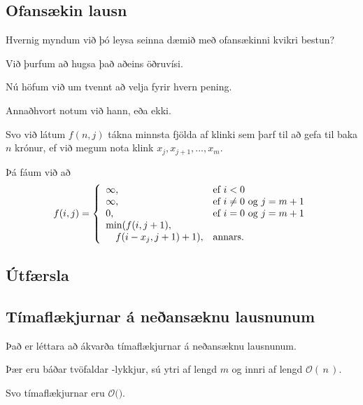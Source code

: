 \subsection{Ofansækin lausn}
{
    {
        \item<1-> Hvernig myndum við þó leysa seinna dæmið með ofansækinni kvikri bestun?
        \item<2-> Við þurfum að hugsa það aðeins öðruvísi.
        \item<3-> Nú höfum við um tvennt að velja fyrir hvern pening.
        \item<4-> Annaðhvort notum við hann, eða ekki.
        \item<5-> Svo við látum $f(n, j)$ tákna minnsta fjölda af klinki sem þarf til að gefa til baka $n$ krónur,
            ef við megum nota klink $x_j, x_{j + 1}, ..., x_m$.
        \item<6-> Þá fáum við að
        \[
            f(i, j) = \left \{
            \env{array}
            {
                {l l}
                \infty, & \text{ef $i < 0$}\\
                \infty, & \text{ef $i \neq 0$ og $j = m + 1$}\\
                0, & \text{ef $i = 0$ og $j = m + 1$}\\
                \text{min}(f(i, j + 1), &\\
                        \quad f(i - x_j, j + 1) + 1), & \text{annars.}\\
            }
            \right .
        \]
    }
}

\subsection{Útfærsla}
{
}

\subsection{Tímaflækjurnar á neðansæknu lausnunum}
{
    {
        \item<1-> Það er léttara að ákvarða tímaflækjurnar á neðansæknu lausnunum.
        \item<2-> Þær eru báðar tvöfaldar -lykkjur, sú ytri af lengd $m$ og innri af lengd $\mathcal{O}(\,n\,)$.
        \item<3-> Svo tímaflækjurnar eru $\mathcal{O}($$)$.
    }
}

